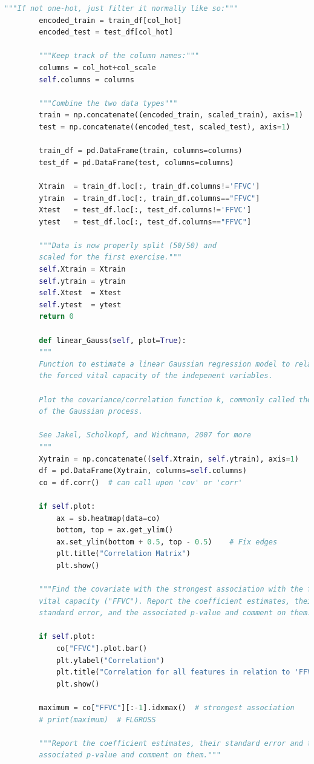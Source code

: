 \documentclass[]{article}
\begin{document}
\begin{lstlisting}[language=Python]
		"""If not one-hot, just filter it normally like so:"""
		encoded_train = train_df[col_hot]
		encoded_test = test_df[col_hot]
		
		"""Keep track of the column names:"""
		columns = col_hot+col_scale
		self.columns = columns
		
		"""Combine the two data types"""
		train = np.concatenate((encoded_train, scaled_train), axis=1)
		test = np.concatenate((encoded_test, scaled_test), axis=1)
		
		train_df = pd.DataFrame(train, columns=columns)
		test_df = pd.DataFrame(test, columns=columns)
		
		Xtrain  = train_df.loc[:, train_df.columns!='FFVC']
		ytrain  = train_df.loc[:, train_df.columns=="FFVC"]
		Xtest   = test_df.loc[:, test_df.columns!='FFVC']
		ytest   = test_df.loc[:, test_df.columns=="FFVC"]
		
		"""Data is now properly split (50/50) and
		scaled for the first exercise."""
		self.Xtrain = Xtrain
		self.ytrain = ytrain
		self.Xtest  = Xtest
		self.ytest  = ytest
		return 0
		
		def linear_Gauss(self, plot=True):
		"""
		Function to estimate a linear Gaussian regression model to relate
		the forced vital capacity of the indepenent variables.
		
		Plot the covariance/correlation function k, commonly called the kernel
		of the Gaussian process.
		
		See Jakel, Scholkopf, and Wichmann, 2007 for more
		"""
		Xytrain = np.concatenate((self.Xtrain, self.ytrain), axis=1)
		df = pd.DataFrame(Xytrain, columns=self.columns)
		co = df.corr()  # can call upon 'cov' or 'corr'
		
		if self.plot:
			ax = sb.heatmap(data=co)
			bottom, top = ax.get_ylim()
			ax.set_ylim(bottom + 0.5, top - 0.5)    # Fix edges
			plt.title("Correlation Matrix")
			plt.show()
		
		"""Find the covariate with the strongest association with the forced
		vital capacity ("FFVC"). Report the coefficient estimates, their
		standard error, and the associated p-value and comment on them."""
		
		if self.plot:
			co["FFVC"].plot.bar()
			plt.ylabel("Correlation")
			plt.title("Correlation for all features in relation to 'FFVC'.")
			plt.show()
			
		maximum = co["FFVC"][:-1].idxmax()  # strongest association
		# print(maximum)  # FLGROSS
		
		"""Report the coefficient estimates, their standard error and the
		associated p-value and comment on them."""
		

\end{lstlisting}
\end{document}
